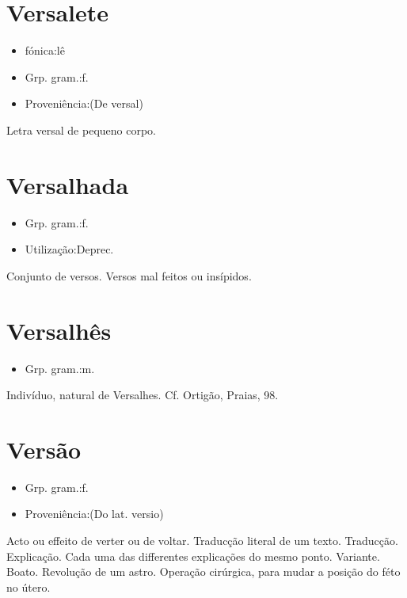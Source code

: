 \documentclass{article}
\begin{document}
\section{Versalete}
\begin{itemize}
\item {fónica:lê}
\end{itemize}
\begin{itemize}
\item {Grp. gram.:f.}
\end{itemize}
\begin{itemize}
\item {Proveniência:(De \textunderscore versal\textunderscore )}
\end{itemize}
Letra versal de pequeno corpo.
\section{Versalhada}
\begin{itemize}
\item {Grp. gram.:f.}
\end{itemize}
\begin{itemize}
\item {Utilização:Deprec.}
\end{itemize}
Conjunto de versos.
Versos mal feitos ou insípidos.
\section{Versalhês}
\begin{itemize}
\item {Grp. gram.:m.}
\end{itemize}
Indivíduo, natural de Versalhes. Cf. Ortigão, \textunderscore Praias\textunderscore , 98.
\section{Versão}
\begin{itemize}
\item {Grp. gram.:f.}
\end{itemize}
\begin{itemize}
\item {Proveniência:(Do lat. \textunderscore versio\textunderscore )}
\end{itemize}
Acto ou effeito de verter ou de voltar.
Traducção literal de um texto.
Traducção.
Explicação.
Cada uma das differentes explicações do mesmo ponto.
Variante.
Boato.
Revolução de um astro.
Operação cirúrgica, para mudar a posição do féto no útero.
\end{document}
